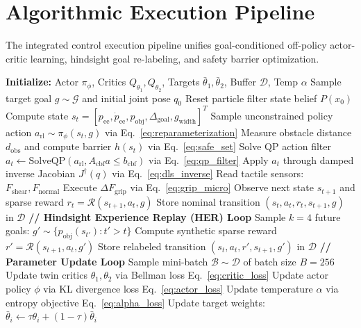 \documentclass[10pt,twocolumn,a4paper]{article}
\begin{document}
\section{Algorithmic Execution Pipeline}
\label{sec:algorithm}
The integrated control execution pipeline unifies goal-conditioned off-policy actor-critic learning, hindsight goal re-labeling, and safety barrier optimization.

\begin{algorithm}[t]
\caption{Safe Goal-Conditioned SAC + HER + CBF Control Loop}
\label{alg:integrated_sac_her}
\begin{algorithmic}[1]
\State \textbf{Initialize:} Actor $\pi_\phi$, Critics $Q_{\theta_1}, Q_{\theta_2}$, Targets $\bar{\theta}_1, \bar{\theta}_2$, Buffer $\mathcal{D}$, Temp $\alpha$
  \State Sample target goal $g \sim \mathcal{G}$ and initial joint pose $q_0$
  \State Reset particle filter state belief $P(x_0)$
    \State Compute state $s_t = [p_{\text{ee}}, \dot{p}_{\text{ee}}, p_{\text{obj}}, \Delta_{\text{goal}}, g_{\text{width}}]^T$
    \State Sample unconstrained policy action $a_{\text{rl}} \sim \pi_\phi(s_t, g)$ via Eq.~\eqref{eq:reparameterization}
    \State Measure obstacle distance $d_{\text{obs}}$ and compute barrier $h(s_t)$ via Eq.~\eqref{eq:safe_set}
    \State Solve QP action filter $a_t \leftarrow \text{SolveQP}(a_{\text{rl}}, A_{\text{cbf}} a \le b_{\text{cbf}})$ via Eq.~\eqref{eq:qp_filter}
    \State Apply $a_t$ through damped inverse Jacobian $J^\dagger(q)$ via Eq.~\eqref{eq:dls_inverse}
    \State Read tactile sensors: $F_{\text{shear}}, F_{\text{normal}}$
     Execute $\Delta F_{\text{grip}}$ via Eq.~\eqref{eq:grip_micro} \EndIf
    \State Observe next state $s_{t+1}$ and sparse reward $r_t = \mathcal{R}(s_{t+1}, a_t, g)$
    \State Store nominal transition $(s_t, a_t, r_t, s_{t+1}, g)$ in $\mathcal{D}$
  \EndFor
  \State \textbf{// Hindsight Experience Replay (HER) Loop}
    \State Sample $k=4$ future goals: $g' \sim \{p_{\text{obj}}(s_{t'}): t' > t\}$
    \State Compute synthetic sparse reward $r' = \mathcal{R}(s_{t+1}, a_t, g')$
    \State Store relabeled transition $(s_t, a_t, r', s_{t+1}, g')$ in $\mathcal{D}$
  \EndFor
  \State \textbf{// Parameter Update Loop}
    \State Sample mini-batch $\mathcal{B} \sim \mathcal{D}$ of batch size $B = 256$
    \State Update twin critics $\theta_1, \theta_2$ via Bellman loss Eq.~\eqref{eq:critic_loss}
    \State Update actor policy $\phi$ via KL divergence loss Eq.~\eqref{eq:actor_loss}
    \State Update temperature $\alpha$ via entropy objective Eq.~\eqref{eq:alpha_loss}
    \State Update target weights: $\bar{\theta}_i \leftarrow \tau \theta_i + (1-\tau)\bar{\theta}_i$
  \EndFor
\EndFor
\end{algorithmic}
\end{algorithm}
\end{document}
